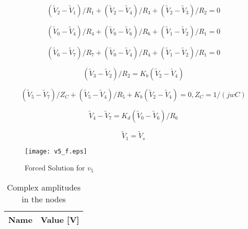 
\begin{equation}
  (\tilde{V}_2 - \tilde{V}_1)/R_1 + (\tilde{V}_2 - \tilde{V}_4)/R_3 + (\tilde{V}_2 - \tilde{V}_3)/R_2 = 0
  \label{eq:4_13}
\end{equation}

\begin{equation}
 (\tilde{V}_0 - \tilde{V}_4)/R_4 + (\tilde{V}_0 - \tilde{V}_6)/R_6 + (\tilde{V}_1 - \tilde{V}_2)/R_1 = 0 
  \label{eq:4_14}
\end{equation}

\begin{equation}
  (\tilde{V}_6 - \tilde{V}_7)/R_7 + (\tilde{V}_0 - \tilde{V}_4)/R_4 + (\tilde{V}_1 - \tilde{V}_2)/R_1 = 0 
  \label{eq:4_15}
\end{equation}

\begin{equation}
  (\tilde{V}_3 - \tilde{V}_2)/R_2 = K_b(\tilde{V}_2 - \tilde{V}_4)
  \label{eq:4_16}
\end{equation}

\begin{equation}
  (\tilde{V}_5 - \tilde{V}_7)/Z_C + (\tilde{V}_5 - \tilde{V}_4)/R_5 + K_b(\tilde{V}_2 - \tilde{V}_4) = 0, Z_C = 1/(jwC)
  \label{eq:4_17}
\end{equation}

\begin{equation}
  \tilde{V}_4 - \tilde{V}_7 = K_d(\tilde{V}_0 - \tilde{V}_6)/R_6
  \label{eq:kvl18}
\end{equation}

\begin{equation}
  \tilde{V}_1 = \tilde{V}_s
  \label{eq:kvl19}
\end{equation}


\begin{figure}[h] \centering
\texttt{[image: v5\_f.eps]}
\caption{Forced Solution for $v_5$}
\label{fig:v5_f}
\end{figure}
\FloatBarrier


\begin{table}[h]
  \centering
  \begin{tabular}{|l|r|}
    \hline    
    {\bf Name} & {\bf Value [V]} \\ \hline
    
  \end{tabular}
  \caption{Complex amplitudes in the nodes}
  \label{tab:Phasors}
\end{table}
\FloatBarrier



